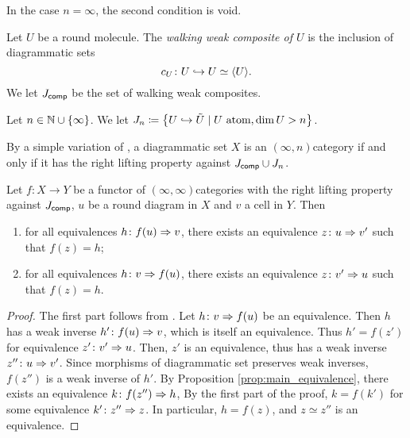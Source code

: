 \begin{rmk}
    In the case \( n = \infty \), the second condition is void.
\end{rmk}

\begin{dfn}
    Let \( U \) be a round molecule.
    The \emph{walking weak composite of \( U \)} is the inclusion of diagrammatic sets
    \begin{equation*}
        c_U \colon U \hookrightarrow U \simeq \langle U\rangle.
    \end{equation*}
    We let \( J_{\mathsf{comp}} \) be the set of walking weak composites.
\end{dfn}

\begin{dfn}
    Let \( n \in \mathbb{N} \cup \left\{ {\infty} \right\} \).
    We let \( J_{n} \coloneqq \left\{ {U \hookrightarrow \tilde{U} \mid U \text{ atom}, \dim U > n } \right\} \).
\end{dfn}

\begin{rmk} \label{rmk:infty_n_cat_iff_rlp_Jcomp_Jn}
    By a simple variation of \cite[Proposition 3.8, Proposition 3.9]{chanavat2024model}, a diagrammatic set \( X \) is an \( (\infty, n) \)\nbd category if and only if it has the right lifting property against \( J_{\mathsf{comp}} \cup J_{n} \).
\end{rmk}

\begin{lem} \label{lem:isofib_left_right_lift}
    Let \( f \colon X \to Y \) be a functor of \( (\infty, \infty) \)\nbd categories with the right lifting property against \( J_{\mathsf{comp}} \), \( u \) be a round diagram in \( X \) and \( v \) a cell in \( Y \).
    Then
    \begin{enumerate}
        \item for all equivalences \( h \colon f(u) \Rightarrow v \), there exists an equivalence \( z \colon u \Rightarrow v' \) such that \( f(z) = h \);
        \item for all equivalences \( h \colon v \Rightarrow f(u) \), there exists an equivalence \( z \colon v' \Rightarrow u \) such that \( f(z) = h \).  
    \end{enumerate}
\end{lem}
\begin{proof}
    The first part follows from \cite[Proposition 3.7]{chanavat2024model}.
    Let \( h \colon v \Rightarrow f(u) \) be an equivalence.
    Then \( h \) has a weak inverse \( h' \colon f(u) \Rightarrow v \), which is itself an equivalence.
    Thus \( h' = f(z') \) for equivalence \( z' \colon v' \Rightarrow u \).
    Then, \( z' \) is an equivalence, thus has a weak inverse \( z'' \colon u \Rightarrow v' \).
    Since morphisms of diagrammatic set preserves weak inverses, \( f(z'') \) is a weak inverse of \( h' \).
    By Proposition \ref{prop:main_equivalence}, there exists an equivalence \( k \colon f(z'') \Rightarrow h \), 
    By the first part of the proof, \( k = f(k') \) for some equivalence \( k' \colon z'' \Rightarrow z \).
    In particular, \( h = f(z) \), and \( z \simeq z'' \) is an equivalence.
\end{proof}


